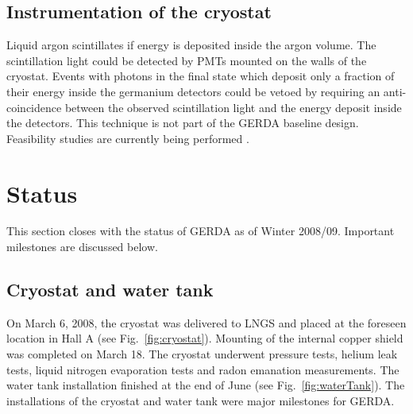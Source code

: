 \subsection{Instrumentation of the cryostat}
\label{sec:gerda:scint}
Liquid argon scintillates if energy is deposited inside the argon volume. The scintillation light could be detected by PMTs mounted on the walls of the cryostat.  Events with photons in the final state which deposit only a fraction of their energy inside the germanium detectors could be vetoed by requiring an anti-coincidence between the observed scintillation light and the energy deposit inside the detectors. This technique is not part of the GERDA baseline design. Feasibility studies are currently being performed \cite{Pei05, Orr06}.

\section{Status}
\label{sec:gerda:stat}
This section closes with the status of GERDA as of Winter 2008/09. Important milestones are discussed below.  

\subsection{Cryostat and water tank}
\label{sec:gerda:stat1}
On March 6, 2008, the cryostat was delivered to LNGS and placed at the foreseen location in Hall A (see Fig.~\ref{fig:cryostat}). Mounting of the internal copper shield was completed on March 18. The cryostat underwent pressure tests, helium leak tests, liquid nitrogen evaporation tests and radon emanation measurements. The water tank installation finished at the end of June (see Fig.~\ref{fig:waterTank}). The installations of the cryostat and water tank were major milestones for GERDA.

